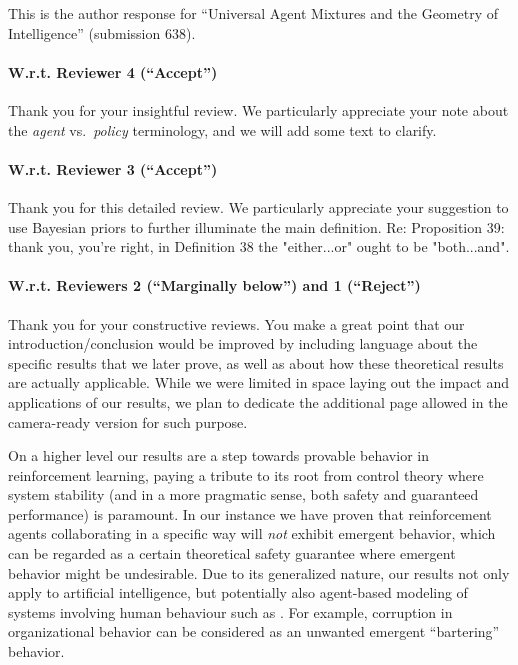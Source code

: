 \documentclass{article}
\begin{document}
This is the author response for ``Universal Agent Mixtures and the Geometry of Intelligence''
(submission 638).

\paragraph{W.r.t. Reviewer 4 (``Accept'')}

Thank you for your insightful review. We particularly appreciate your note about the \emph{agent} vs.\ \emph{policy} terminology, and we will add some text to clarify.

\paragraph{W.r.t. Reviewer 3 (``Accept'')}

Thank you for this detailed review. We particularly appreciate your suggestion to use Bayesian priors to further illuminate the main definition. Re: Proposition 39: thank you, you're right, in Definition 38 the "either...or" ought to be "both...and".

\paragraph{W.r.t. Reviewers 2 (``Marginally below'') and 1 (``Reject'')}

Thank you for your constructive reviews. You make a great point that our introduction/conclusion would
be improved by including language about the specific results that we later prove, as well as
about how these theoretical results are actually applicable.
While we were limited in space laying out the impact and applications of our results, we plan to dedicate the additional page allowed in the camera-ready version for such purpose.

On a higher level our results are a step towards provable behavior in reinforcement learning,
paying a tribute to its root from control theory where system stability (and in a more pragmatic sense,
both safety and guaranteed performance)
is paramount.
In our instance we have proven that reinforcement agents collaborating
in a specific way will \emph{not} exhibit emergent behavior, which
can be regarded as a certain theoretical safety guarantee where emergent behavior might be undesirable.
Due to its generalized nature, our results not only apply to artificial intelligence,
but potentially also agent-based modeling of
systems involving human behaviour such as \cite{Bouarfa2013AgentbasedMA}.
For example, corruption in organizational behavior can be considered as an unwanted emergent ``bartering'' behavior. 
\end{document}
